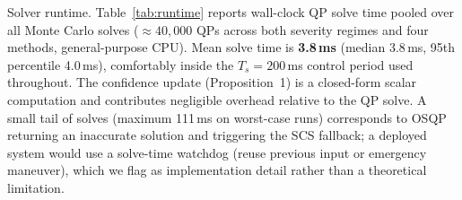 %
%            
%
%


%



% 


Solver runtime.
Table~\ref{tab:runtime} reports wall-clock QP solve time pooled over all
Monte Carlo solves (${\approx}40{,}000$ QPs across both severity regimes and
four methods, general-purpose CPU).
Mean solve time is \textbf{3.8\,ms} (median 3.8\,ms, 95th percentile
4.0\,ms), comfortably inside the $T_s=200$\,ms control period used throughout.
The confidence update (Proposition~1) is a closed-form scalar computation and
contributes negligible overhead relative to the QP solve.
A small tail of solves (maximum 111\,ms on worst-case runs) corresponds to
OSQP returning an inaccurate solution and triggering the SCS fallback; a
deployed system would use a solve-time watchdog (reuse previous input or
emergency maneuver), which we flag as implementation detail rather than a
theoretical limitation.


